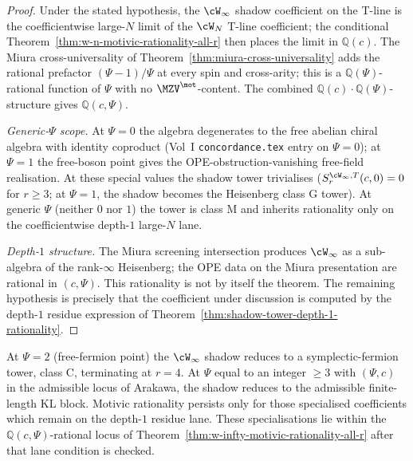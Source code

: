 \begin{proof}
Under the stated hypothesis, the $\cW_{\infty}$ shadow coefficient on
the T-line is the coefficientwise large-$N$ limit of the $\cW_N$
T-line coefficient; the
conditional Theorem~\ref{thm:w-n-motivic-rationality-all-r} then
places the limit in $\mathbb{Q}(c)$. The Miura cross-universality of
Theorem~\ref{thm:miura-cross-universality} adds the rational prefactor
$(\Psi - 1)/\Psi$ at every spin and cross-arity; this is a
$\mathbb{Q}(\Psi)$-rational function of $\Psi$ with no
$\MZV^{\mot}$-content. The combined $\mathbb{Q}(c) \cdot
\mathbb{Q}(\Psi)$-structure gives $\mathbb{Q}(c, \Psi)$.

\emph{Generic-$\Psi$ scope.} At $\Psi = 0$ the algebra degenerates
to the free abelian chiral algebra with identity coproduct
(Vol~I \texttt{concordance.tex} entry on $\Psi = 0$); at $\Psi = 1$
the free-boson point gives the OPE-obstruction-vanishing free-field
realisation. At these special values the shadow tower trivialises
($S_r^{\cW_{\infty}, T}(c, 0) = 0$ for $r \geq 3$; at $\Psi = 1$, the
shadow becomes the Heisenberg class G tower). At generic $\Psi$
(neither $0$ nor $1$) the tower is class M and inherits rationality
only on the coefficientwise depth-$1$ large-$N$ lane.

\emph{Depth-$1$ structure.} The Miura screening intersection
produces $\cW_{\infty}$ as a sub-algebra of the rank-$\infty$
Heisenberg; the OPE data on the Miura presentation are rational in
$(c, \Psi)$. This rationality is not by itself the theorem. The
remaining hypothesis is precisely that the coefficient under
discussion is computed by the depth-$1$ residue expression of
Theorem~\ref{thm:shadow-tower-depth-1-rationality}.
\end{proof}

\begin{remark}
At $\Psi = 2$ (free-fermion point) the $\cW_{\infty}$ shadow reduces
to a symplectic-fermion tower, class C, terminating at $r = 4$. At
$\Psi$ equal to an integer $\geq 3$ with $(\Psi, c)$ in the
admissible locus of Arakawa, the shadow reduces to the admissible
finite-length KL block. Motivic rationality persists only for those
specialised coefficients which remain on the depth-$1$ residue lane.
These specialisations lie within the $\mathbb{Q}(c,\Psi)$-rational
locus of Theorem~\ref{thm:w-infty-motivic-rationality-all-r} after
that lane condition is checked.
\end{remark}


